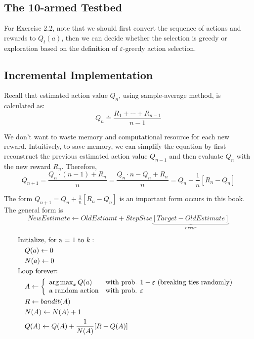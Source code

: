 \documentclass[sutton_barto_notes.tex]{subfiles}
\begin{document}
\subsection{The 10-armed Testbed}

For Exercise 2.2, note that we should first convert the sequence of actions and rewards to $Q_t(a)$, then we can decide whether the selection is greedy or exploration based on the definition of $\varepsilon$-greedy action selection.

\subsection{Incremental Implementation}

Recall that estimated action value $Q_n$, using sample-average method, is calculated as:
$$ Q_n \doteq \frac{R_1 + \cdots + R_{n-1}}{n-1} $$

We don't want to waste memory and computational resource for each new reward.
Intuitively, to save memory, we can simplify the equation by first reconstruct the previous estimated action value $Q_{n-1}$ and then evaluate $Q_n$ with the new reward $R_n$.
Therefore,
$$ Q_{n+1} = \frac{Q_n \cdot (n-1) + R_n}{n} = \frac{Q_n \cdot n - Q_n + R_n}{n} = Q_n + \frac{1}{n}[R_n - Q_n] $$

The form $Q_{n+1} = Q_n + \frac{1}{n}[R_n - Q_n]$ is an important form occurs in this book. The general form is
$$ NewEstimate \leftarrow OldEstiamt + StepSize\underbrace{[Target - OldEstimate]}_{error} $$

\begin{tcolorbox}[width=\textwidth,title={A simple bandit algorithm}]
	\begin{align*}
	   & \text{Initialize, for a = 1 to }k: \\
	   & \quad Q(a) \leftarrow 0 \\
	   & \quad N(a) \leftarrow 0 \\
	   & \text{Loop forever: }\\
	   & \quad A \leftarrow \left\{
	    \begin{array}{ll}
	        \operatorname*{arg\,max}_x Q(a) & \text{with prob. } 1 - \varepsilon \text{ (breaking ties randomly) }\\
	        \text{a random action} & \text{with prob. } \varepsilon
	    \end{array}
	\right. \\
	   & \quad R \leftarrow bandit(A) \\
	   & \quad N(A) \leftarrow N(A) + 1 \\
	   & \quad Q(A) \leftarrow Q(A) + \frac{1}{N(A)}[R-Q(A)]
	\end{align*}
\end{tcolorbox}
\end{document}

